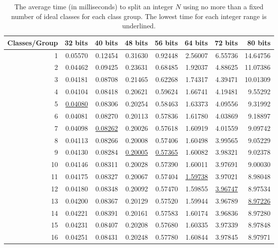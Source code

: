 \documentclass{ucalgthes1}
\theoremstyle{definition}
\begin{document}
\begin{table}[htb]
\centering
\begin{tabular}{| r | r | r | r | r | r | r | r |}
	\hline
Classes/Group & 32 bits & 40 bits & 48 bits & 56 bits & 64 bits & 72 bits & 80 bits \\
	\hline
1 & 0.05570 & 0.12454 & 0.31630 & 0.92448 & 2.56007 & 6.55736 & 14.64756 \\
2 & 0.04462 & 0.09425 & 0.23631 & 0.68485 & 1.92037 & 4.88625 & 11.07386 \\
3 & 0.04181 & 0.08708 & 0.21465 & 0.62268 & 1.74317 & 4.39471 & 10.01309 \\
4 & 0.04104 & 0.08418 & 0.20621 & 0.59624 & 1.66741 & 4.19481 & 9.55292 \\
5 & \underline{0.04080} & 0.08306 & 0.20254 & 0.58463 & 1.63373 & 4.09556 & 9.31992 \\
6 & 0.04081 & 0.08270 & 0.20113 & 0.57836 & 1.61780 & 4.03869 & 9.18897 \\
7 & 0.04098 & \underline{0.08262} & 0.20026 & 0.57618 & 1.60919 & 4.01559 & 9.09742 \\
8 & 0.04113 & 0.08266 & 0.20008 & 0.57406 & 1.60498 & 3.99565 & 9.05229 \\
9 & 0.04130 & 0.08284 & \underline{0.20005} & \underline{0.57365} & 1.60082 & 3.98321 & 9.02378 \\
10 & 0.04146 & 0.08311 & 0.20028 & 0.57390 & 1.60011 & 3.97691 & 9.00030 \\
11 & 0.04175 & 0.08327 & 0.20067 & 0.57404 & \underline{1.59738} & 3.97021 & 8.98048 \\
12 & 0.04180 & 0.08348 & 0.20092 & 0.57470 & 1.59855 & \underline{3.96747} & 8.97534 \\
13 & 0.04200 & 0.08367 & 0.20129 & 0.57520 & 1.59944 & 3.96789 & \underline{8.97226} \\
14 & 0.04221 & 0.08391 & 0.20161 & 0.57583 & 1.60174 & 3.96836 & 8.97280 \\
15 & 0.04231 & 0.08407 & 0.20208 & 0.57680 & 1.60335 & 3.97339 & 8.97848 \\
16 & 0.04251 & 0.08431 & 0.20248 & 0.57780 & 1.60844 & 3.97845 & 8.97971 \\
	\hline
\end{tabular}
\caption[Average time to factor for a fixed number of classes per group.]{The average time (in milliseconds) to split an integer $N$ using no more than a fixed number of ideal classes for each class group.  The lowest time for each integer range is underlined.}
\label{tab:attemptedIdealClasses}
\end{table}
\end{document}
